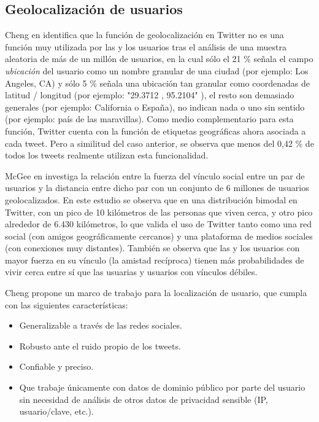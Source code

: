 \subsection{Geolocalización de usuarios} \label{sebsec:geoestadoarte}

 Cheng en \cite{Cheng:2010:YYT:1871437.1871535} identifica que la función de geolocalización en Twitter no es una función muy utilizada por las y los usuarios tras el análisis de una muestra aleatoria de más de un millón de usuarios, en la cual sólo el 21 \% señala el campo \emph{ubicación} del usuario como un nombre granular de una ciudad (por ejemplo: Los Angeles, CA) y sólo 5 \% señala una ubicación tan granular como coordenadas de latitud / longitud (por ejemplo: "29.3712 , 95.2104" ), el resto son demasiado generales (por ejemplo: California o España), no indican nada o uno sin sentido (por ejemplo: país de las maravillas). Como medio complementario para esta función, Twitter cuenta con la función de etiquetas geográficas ahora asociada a cada tweet. Pero a similitud del caso anterior, se observa que menos del 0,42 \% de todos los tweets realmente utilizan esta funcionalidad.

McGee en \cite{McGee:2011:GST:2063576.2063959} investiga la relación entre la fuerza del vínculo social entre un par de usuarios y la distancia entre dicho par con un conjunto de 6 millones de usuarios geolocalizados. En este estudio se observa que en una distribución bimodal en Twitter, con un pico de 10 kilómetros de las personas que viven cerca, y otro pico alrededor de 6.430 kilómetros, lo que valida el uso de Twitter tanto como una red social (con amigos geográficamente cercanos) y una plataforma de medios sociales (con conexiones muy distantes). También se observa que las y los usuarios con mayor fuerza en su vínculo (la amistad recíproca) tienen más probabilidades de vivir cerca entre sí que las usuarias y usuarios con vínculos débiles.

Cheng propone un marco de trabajo para la localización de usuario, que cumpla con las siguientes características:
\begin{itemize}
 \item Generalizable a través de las redes sociales.
 \item Robusto ante el ruido propio de los tweets.
 \item Confiable y preciso.
 \item Que trabaje únicamente con datos de dominio público por parte del usuario sin necesidad de análisis de otros datos de privacidad sensible (IP, usuario/clave, etc.).
\end{itemize}

